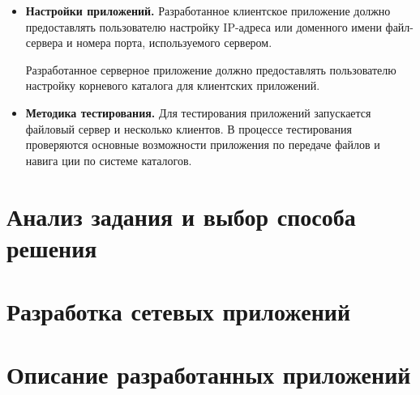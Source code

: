 \begin{itemize}
	\item \textbf{Настройки приложений.} Разработанное клиентское приложение должно предоставлять пользователю настройку IP-адреса или доменного имени файл-сервера и номера порта, используемого сервером.
	
	Разработанное серверное приложение должно предоставлять пользователю настройку корневого каталога для клиентских приложений.

	\item \textbf{Методика тестирования.} Для тестирования приложений запускается файловый сервер и несколько клиентов. В процессе тестирования проверяются основные возможности приложения по передаче файлов и навига	ции по системе каталогов.

\end{itemize}

\section{Анализ задания и выбор способа решения}


\section{Разработка сетевых приложений}


\section{Описание разработанных приложений}


